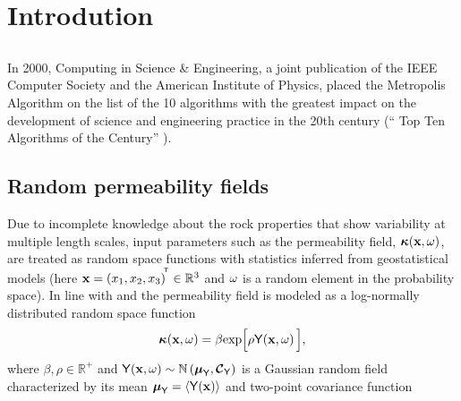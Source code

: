 \section{Introdution}

\subsection{\mcmc}

In 2000, Computing in Science \& Engineering, a joint publication of the IEEE Computer Society and the American Institute of Physics, placed the Metropolis Algorithm on the list of the 10 algorithms with the greatest impact on the development of science and engineering practice in the 20th century (“ Top Ten Algorithms of the Century”  \citep{top10}).

\subsection{Random permeability fields}\label{fieldgeneratio}

Due to incomplete knowledge about the rock properties that show variability at multiple length scales, input parameters such as the permeability field, $\boldsymbol{\kappa}(\mathbf{x},\omega)$, are treated as random space functions with statistics inferred from geostatistical models (here $\mathbf{x} =\left( x_{1},x_{2},x_{3}  \right)^{\! ^{\mathsf{T}}}\in \mathbb{R}^{3}$ and $\omega$ is a random element in the probability space).
In line with \cite{dagan89} and \cite{gelhar93} the permeability field is modeled as a log-normally distributed random space function
%
\begin{equation}
  \boldsymbol{\kappa}\!\left(\mathbf{x},\omega\right) = \beta\mbox{exp}\Big[\rho\mathsf{Y}\!\left(\mathbf{x},\omega\right)\Big],
\label{field}
\end{equation}
%
\noindent where $\beta,\rho\in\mathbb{R}^{+}$ and $\mathsf{Y}\!\left(\mathbf{x},\omega\right) \sim \mathbb{N}\left({\boldsymbol{\mu}_{\mathsf{Y}}},{\boldmath{\mbox{$\mathcal{C}$}}}_{\mathsf{Y}}\right)$ is a Gaussian random field
characterized by its mean ${\boldsymbol{\mu}_{\mathsf{Y}}} = \langle {\mathsf{Y}\!\left(\mathbf{x}\right)} \rangle$ and two-point covariance function

